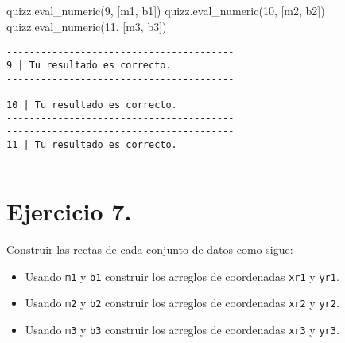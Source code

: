 \documentclass[
  letterpaper,
  DIV=11,
  numbers=noendperiod]{scrreprt}
\newenvironment{Shaded}{\begin{snugshade}}{\end{snugshade}}
\newcommand{\NormalTok}[1]{\textcolor[rgb]{0.00,0.23,0.31}{#1}}
\newcommand{\StringTok}[1]{\textcolor[rgb]{0.13,0.47,0.30}{#1}}
\providecommand{\tightlist}{%
  \setlength{\itemsep}{0pt}\setlength{\parskip}{0pt}}\usepackage{longtable,booktabs,array}
\begin{document}
\begin{Shaded}
\begin{Highlighting}[]
\NormalTok{quizz.eval\_numeric(}\StringTok{\textquotesingle{}9\textquotesingle{}}\NormalTok{, [m1, b1])}
\NormalTok{quizz.eval\_numeric(}\StringTok{\textquotesingle{}10\textquotesingle{}}\NormalTok{, [m2, b2])}
\NormalTok{quizz.eval\_numeric(}\StringTok{\textquotesingle{}11\textquotesingle{}}\NormalTok{, [m3, b3])}
\end{Highlighting}
\end{Shaded}

\begin{verbatim}
----------------------------------------
9 | Tu resultado es correcto.
----------------------------------------
----------------------------------------
10 | Tu resultado es correcto.
----------------------------------------
----------------------------------------
11 | Tu resultado es correcto.
----------------------------------------
\end{verbatim}

\section{\texorpdfstring{\textbf{Ejercicio
7.}}{Ejercicio 7.}}\label{ejercicio-7.}

Construir las rectas de cada conjunto de datos como sigue:

\begin{itemize}
\tightlist
\item
  Usando \texttt{m1} y \texttt{b1} construir los arreglos de coordenadas
  \texttt{xr1} y \texttt{yr1}.
\item
  Usando \texttt{m2} y \texttt{b2} construir los arreglos de coordenadas
  \texttt{xr2} y \texttt{yr2}.
\item
  Usando \texttt{m3} y \texttt{b3} construir los arreglos de coordenadas
  \texttt{xr3} y \texttt{yr3}.
\end{itemize}
\end{document}
